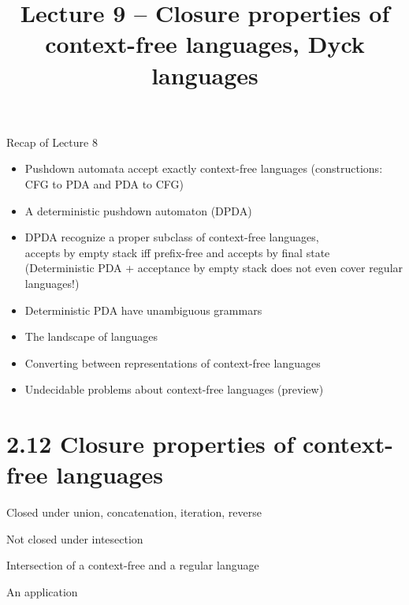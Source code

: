 \documentclass[handout]{beamer}
\title{Lecture 9 -- Closure properties of context-free languages, Dyck languages}
\begin{document}
\frame{\titlepage}


\begin{frame}{Recap of Lecture 8}
	
    \begin{itemize}
        \item Pushdown automata accept exactly context-free languages (constructions: CFG to PDA and PDA to CFG)
        \item A deterministic pushdown automaton (DPDA)
        \item DPDA recognize a proper subclass of context-free languages,\\ accepts by empty stack iff prefix-free and accepts by final state\\
        (Deterministic PDA + acceptance by empty stack does not even cover regular languages!)
        \item Deterministic PDA have unambiguous grammars
        \item The landscape of languages
        \item Converting between representations of context-free languages
        \item Undecidable problems about context-free languages (preview)
	\end{itemize}

\end{frame}


\section*{2.12 Closure properties of context-free languages}


\begin{frame}{Closed under union, concatenation, iteration, reverse}

        

\end{frame}


\begin{frame}{Not closed under intesection}

    

\end{frame}


\begin{frame}{Intersection of a context-free and a regular language}
    

\end{frame}


\begin{frame}{An application}


\end{frame}
\end{document}
